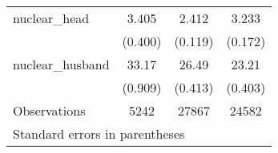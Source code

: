 {\begin{tabular}{l*{3}{c}}
\addlinespace
nuclear\_head        &       3.405\sym{***}&       2.412\sym{***}&       3.233\sym{***}\\
                    &     (0.400)         &     (0.119)         &     (0.172)         \\
\addlinespace
nuclear\_husband     &       33.17\sym{***}&       26.49\sym{***}&       23.21\sym{***}\\
                    &     (0.909)         &     (0.413)         &     (0.403)         \\
\midrule
Observations        &        5242         &       27867         &       24582         \\
\bottomrule
\multicolumn{4}{l}{\footnotesize Standard errors in parentheses}\\

\end{tabular}
}
